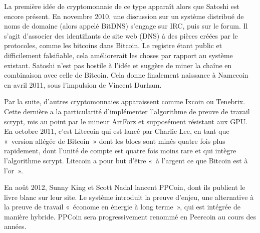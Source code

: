 La première idée de cryptomonnaie de ce type apparaît alors que Satoshi est encore présent. En novembre 2010, une discussion sur un système distribué de noms de domaine (alors appelé BitDNS) s'engage sur IRC, puis sur le forum. Il s'agit d'associer des identifiants de site web (DNS) à des pièces créées par le protocoles, comme les bitcoins dans Bitcoin. Le registre étant public et difficilement falsifiable, cela améliorerait les choses par rapport au système existant. Satoshi n'est pas hostile à l'idée et suggère de miner la chaîne en combinaison avec celle de Bitcoin. Cela donne finalement naissance à Namecoin en avril 2011, sous l'impulsion de Vincent Durham.

Par la suite, d'autres cryptomonnaies apparaissent comme Ixcoin ou Tenebrix. Cette dernière a la particularité d'implémenter l'algorithme de preuve de travail scrypt, mis au point par le mineur ArtForz et supposément résistant aux GPU. En octobre 2011, c'est Litecoin qui est lancé par Charlie Lee, en tant que «~version allégée de Bitcoin~» dont les blocs sont minés quatre fois plus rapidement, dont l'unité de compte est quatre fois moins rare et qui intègre l'algorithme scrypt. Litecoin a pour but d'être «~à l'argent ce que Bitcoin est à l'or~».

En août 2012, Sunny King et Scott Nadal lancent PPCoin, dont ils publient le livre blanc sur leur site. Le système introduit la preuve d'enjeu, une alternative à la preuve de travail «~économe en énergie à long terme~», qui est intégrée de manière hybride. PPCoin sera progressivement renommé en Peercoin au cours des années.

